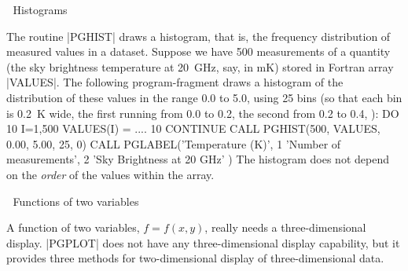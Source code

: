 
\beginsection Histograms

The routine |PGHIST| draws a histogram, that is, the frequency distribution 
of measured values in a dataset.  Suppose we have 500 measurements of
a quantity (the sky brightness temperature at 20~GHz, say, in mK) stored
in Fortran array |VALUES|.  The following program-fragment draws a
histogram of the distribution of these values in the range 0.0 to 5.0,
using 25 bins (so that each bin is 0.2~K wide, the first running from 
0.0 to 0.2, the second from 0.2 to 0.4, \etc):
\begintt
      DO 10 I=1,500
          VALUES(I) = ....
   10 CONTINUE
      CALL PGHIST(500, VALUES, 0.00, 5.00, 25, 0)
      CALL PGLABEL('Temperature (K)',
     1             'Number of measurements',
     2             'Sky Brightness at 20 GHz' )
\endtt
The histogram does not depend on the {\it order\/} of the values within 
the array.


\beginsection Functions of two variables

A function of two variables, $f = f(x,y)$, really needs a 
three-dimensional display. |PGPLOT| does not have any three-dimensional
display capability, but it provides three methods for two-dimensional
display of three-dimensional data.


